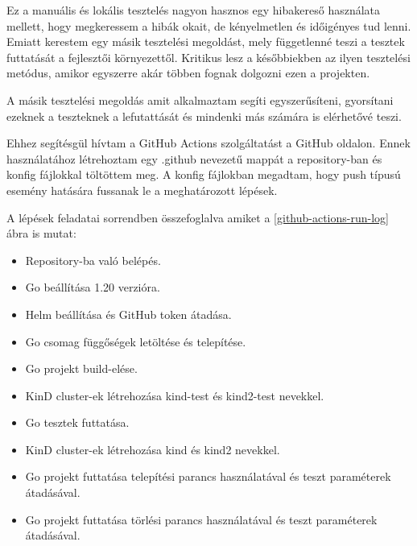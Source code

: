 Ez a manuális és lokális tesztelés nagyon hasznos egy hibakereső használata mellett, hogy megkeressem a hibák okait, de kényelmetlen és időigényes tud lenni.
Emiatt kerestem egy másik tesztelési megoldást, mely függetlenné teszi a tesztek futtatását a fejlesztői környezettől.
Kritikus lesz a későbbiekben az ilyen tesztelési metódus, amikor egyszerre akár többen fognak dolgozni ezen a projekten.

A másik tesztelési megoldás amit alkalmaztam segíti egyszerűsíteni, gyorsítani ezeknek a teszteknek a lefutattását és mindenki más számára is elérhetővé teszi. 

Ehhez segítésgül hívtam a GitHub Actions szolgáltatást a GitHub oldalon.
Ennek használatához létrehoztam egy .github nevezetű mappát a repository-ban és konfig fájlokkal töltöttem meg.
A konfig fájlokban megadtam, hogy push típusú esemény hatására fussanak le a meghatározott lépések.

A lépések feladatai sorrendben összefoglalva amiket a \ref{github-actions-run-log} ábra is mutat:
\begin{itemize}
  \item Repository-ba való belépés.
  \item Go beállítása 1.20 verzióra.
  \item Helm beállítása és GitHub token átadása.
  \item Go csomag függőségek letöltése és telepítése.
  \item Go projekt build-elése.
  \item KinD cluster-ek létrehozása kind-test és kind2-test nevekkel.
  \item Go tesztek futtatása.
  \item KinD cluster-ek létrehozása kind és kind2 nevekkel.
  \item Go projekt futtatása telepítési parancs használatával és teszt paraméterek átadásával.
  \item Go projekt futtatása törlési parancs használatával és teszt paraméterek átadásával.
\end{itemize} 

